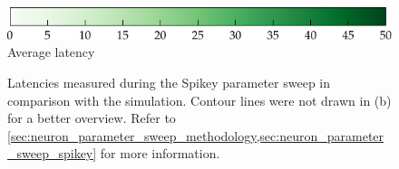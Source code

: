 \begin{figure}
	\centering
	\small
	\hspace*{7.5mm}\includegraphics{media/chp5/colorbar_lat2.pdf}
	{\footnotesize Average latency \latency [\si{\milli\second}]}
	\caption[Spikey parameter sweep latencies]{Latencies measured during the Spikey parameter sweep in comparison with the \NEST simulation. Contour lines were not drawn in (b) for a better overview. Refer to \cref{sec:neuron_parameter_sweep_methodology,sec:neuron_parameter_sweep_spikey} for more information.}
	\label{fig:exp2_sweepIb}
\end{figure}


